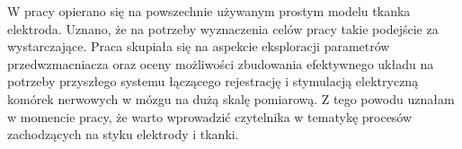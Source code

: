 \begin{frame}[t]

    \begin{block}{\tb}
    \end{block}
W pracy opierano się na powszechnie używanym prostym modelu tkanka elektroda. Uznano, że na potrzeby wyznaczenia celów pracy takie podejście za wystarczające. 
Praca skupiała się na aspekcie eksploracji parametrów przedwzmacniacza oraz oceny możliwości zbudowania efektywnego układu na potrzeby przyszłego systemu łączącego rejestrację i stymulacją elektryczną komórek nerwowych w mózgu na dużą skalę pomiarową.
Z tego powodu uznałam w momencie pracy, że warto wprowadzić czytelnika w tematykę procesów zachodzących na styku elektrody i tkanki. 

\end{frame}

